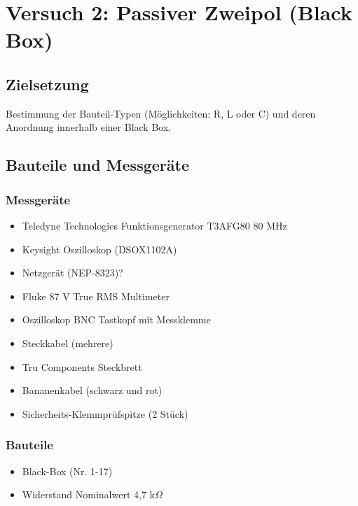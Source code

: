 \documentclass[a4paper,12pt]{article}
\begin{document}
\newpage
\section{Versuch 2: Passiver Zweipol (Black Box)}
\subsection{Zielsetzung}
Bestimmung der Bauteil-Typen (Möglichkeiten: R, L oder C) und deren Anordnung innerhalb einer
Black Box.

\subsection{Bauteile und Messgeräte}
\subsubsection*{Messgeräte}
\begin{itemize}
\item Teledyne Technologies Funktionsgenerator T3AFG80 80 MHz
\item Keysight Oszilloskop (DSOX1102A)
\item Netzgerät (NEP-8323)?
\item Fluke 87 V True RMS Multimeter
\item Oszilloskop BNC Tastkopf mit Messklemme
\item Steckkabel (mehrere)
\item Tru Components Steckbrett
\item Bananenkabel (schwarz und rot)
\item Sicherheits-Klemmprüfspitze (2 Stück)
\end{itemize}

\subsubsection*{Bauteile}
\begin{itemize}
\item Black-Box (Nr. 1-17)
\item Widerstand Nominalwert 4,7 k$\Omega$
\end{itemize}
\end{document}
